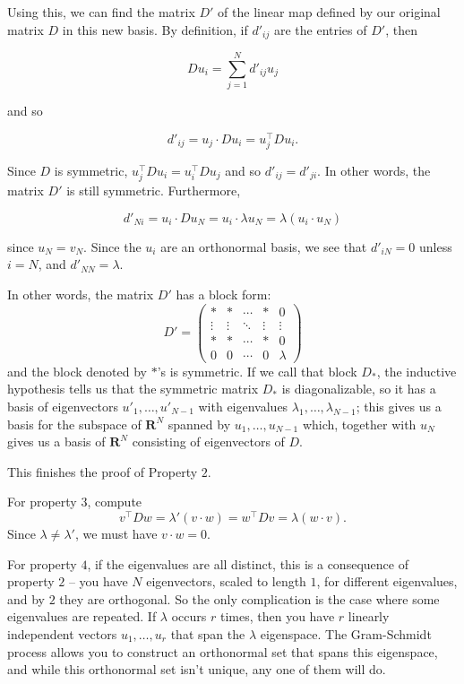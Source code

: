 \documentclass[
  11pt,
  letterpaper,
]{scrbook}
\theoremstyle{plain}
\theoremstyle{plain}
\theoremstyle{remark}
\begin{document}
Using this, we can find the matrix \(D'\) of the linear map defined by
our original matrix \(D\) in this new basis. By definition, if
\(d'_{ij}\) are the entries of \(D'\), then

\[
Du_{i} = \sum_{j=1}^{N} d'_{ij} u_{j}
\]

and so

\[
d'_{ij} = u_{j}\cdot Du_{i} = u_{j}^{\intercal}Du_{i}.
\]

Since \(D\) is symmetric,
\(u_{j}^{\intercal}Du_{i} =u_{i}^{\intercal}Du_{j}\) and so
\(d'_{ij}=d'_{ji}\). In other words, the matrix \(D'\) is still
symmetric. Furthermore,

\[
d'_{Ni} = u_{i}\cdot Du_{N} = u_{i}\cdot \lambda u_{N} = \lambda (u_{i}\cdot u_{N})
\]

since \(u_{N}=v_{N}\). Since the \(u_{i}\) are an orthonormal basis, we
see that \(d'_{iN}=0\) unless \(i=N\), and \(d'_{NN}=\lambda\).

In other words, the matrix \(D'\) has a block form: \[
D' = \left(\begin{matrix} *&* & \cdots &*  & 0 \\ \vdots & \vdots & \ddots   & \vdots & \vdots \\
* & *& \cdots &*  & 0 \\
0 & 0 & \cdots &0 &\lambda \end{matrix}\right)
\] and the block denoted by \(*\)'s is symmetric. If we call that block
\(D_{*}\), the inductive hypothesis tells us that the symmetric matrix
\(D_{*}\) is diagonalizable, so it has a basis of eigenvectors
\(u'_{1},\ldots, u'_{N-1}\) with eigenvalues
\(\lambda_{1},\ldots, \lambda_{N-1}\); this gives us a basis for the
subspace of \(\mathbf{R}^{N}\) spanned by \(u_{1},\ldots, u_{N-1}\)
which, together with \(u_{N}\) gives us a basis of \(\mathbf{R}^{N}\)
consisting of eigenvectors of \(D\).

This finishes the proof of Property \(2\).

For property \(3\), compute \[
v^{\intercal}Dw = \lambda'(v\cdot w)=w^{\intercal}Dv = \lambda (w\cdot v).
\] Since \(\lambda\not=\lambda'\), we must have \(v\cdot w=0\).

For property \(4\), if the eigenvalues are all distinct, this is a
consequence of property \(2\) -- you have \(N\) eigenvectors, scaled to
length \(1\), for different eigenvalues, and by \(2\) they are
orthogonal. So the only complication is the case where some eigenvalues
are repeated. If \(\lambda\) occurs \(r\) times, then you have \(r\)
linearly independent vectors \(u_{1},\ldots, u_{r}\) that span the
\(\lambda\) eigenspace. The Gram-Schmidt process allows you to construct
an orthonormal set that spans this eigenspace, and while this
orthonormal set isn't unique, any one of them will do.
\end{document}

